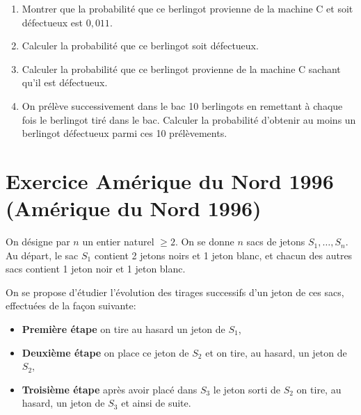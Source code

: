 \documentclass{article}
\makeatletter
\newcounter{Exercice}
\newcommand{\exercice}[1][\@nil]{\refstepcounter{Exercice}
	\section*{Exercice \theExercice
	\def\tmp{#1}
	\ifx\tmp\@nnil
	\else
	(#1)
	\fi
}}
\makeatother
\begin{document}
\begin{enumerate}
	\item Montrer que la probabilité que ce berlingot provienne de la machine C et soit défectueux est $0{,}011$.
	\item Calculer la probabilité que ce berlingot soit défectueux.
	\item Calculer la probabilité que ce berlingot provienne de la machine C sachant qu'il est défectueux.
	\item On prélève successivement dans le bac 10 berlingots en remettant à chaque fois le berlingot tiré dans le bac. Calculer la probabilité d'obtenir au moins un berlingot défectueux parmi ces 10 prélèvements.
\end{enumerate}


\exercice[Amérique du Nord 1996]

On désigne par $n$ un entier naturel $\geq 2$. On se donne $n$ sacs de jetons $S_1,\ldots,S_n$. Au départ, le sac $S_1$ contient 2 jetons noirs et 1 jeton blanc, et chacun des autres sacs contient 1 jeton noir et 1 jeton blanc.

On se propose d'étudier l'évolution des tirages successifs d'un jeton de ces sacs, effectuées de la façon suivante:
\begin{itemize}
	\item \textbf{Première étape} on tire au hasard un jeton de $S_1$,
	\item \textbf{Deuxième étape} on place ce jeton de $S_2$ et on tire, au hasard, un jeton de $S_2$,
	\item \textbf{Troisième étape} après avoir placé dans $S_3$ le jeton sorti de $S_2$ on tire, au hasard, un jeton de $S_3$ et ainsi de suite. 
\end{itemize}

\begin{figure}[h]
	\centering
{}
\end{figure}
\end{document}
